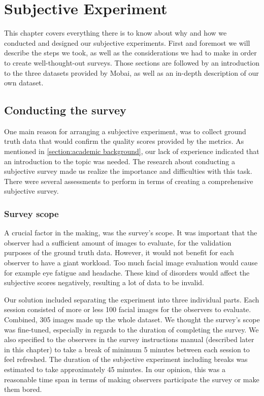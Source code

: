 \chapter{Subjective Experiment}
\label{chap:subjective}
This chapter covers everything there is to know about why and how we conducted and designed our subjective experiments. First and foremost we will describe the steps we took, as well as the considerations we had to make in order to create well-thought-out surveys. Those sections are followed by an introduction to the three datasets provided by Mobai, as well as an in-depth description of our own dataset. 

\section{Conducting the survey}
\label{sec:ConductingSurvey}
One main reason for arranging a subjective experiment, was to collect ground truth data that would confirm the quality scores provided by the metrics. As mentioned in \ref{section:academic background}, our lack of experience indicated that an introduction to the topic was needed. The research about conducting a subjective survey made us realize the importance and difficulties with this task. There were several assessments to perform in terms of creating a comprehensive subjective survey.

\subsection*{Survey scope}
A crucial factor in the making, was the survey's scope. It was important that the observer had a sufficient amount of images to evaluate, for the validation purposes of the ground truth data. However, it would not benefit for each observer to have a giant workload. Too much facial image evaluation would cause for example eye fatigue and headache. These kind of disorders would affect the subjective scores negatively, resulting a lot of data to be invalid. 

Our solution included separating the experiment into three individual parts. Each session consisted of more or less 100 facial images for the observers to evaluate. Combined, 305 images made up the whole dataset. We thought the survey's scope was fine-tuned, especially in regards to the duration of completing the survey. We also specified to the observers in the survey instructions manual (described later in this chapter) to take a break of minimum 5 minutes between each session to feel refreshed. The duration of the subjective experiment including breaks was estimated to take approximately 45 minutes. In our opinion, this was a reasonable time span in terms of making observers participate the survey or make them bored. 

